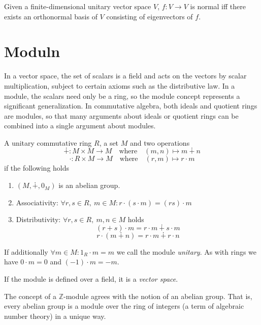 \begin{proposition}
   Given a finite-dimensional unitary vector space \(V\), \(f: V \to V\) is normal iff there exists an orthonormal basis of \(V\) consisting of eigenvectors of \(f\).
\end{proposition}

\section{Moduln}
In a vector space, the set of scalars is a field and acts on the vectors by scalar multiplication, subject to certain axioms such as the distributive law.
In a module, the scalars need only be a ring, so the module concept represents a significant generalization.
In commutative algebra, both ideals and quotient rings are modules, so that many arguments about ideals or quotient rings can be combined into a single argument about modules.

\begin{definition}[R-Module]
   A unitary commutative ring \(R\), a set \(M\) and two operations
   \[\dotplus: M \times M \to M \quad\text{where}\quad (m, n) \mapsto m \dotplus n\]
   \[\cdot: R \times M \to M \quad\text{where}\quad (r, m) \mapsto r \cdot m\]
   if the following holds
   \begin{enumerate}[label=\roman*, align=Center]
      \item \((M, \dotplus, 0_M)\) is an abelian group.
      \item Associativity: \(\forall r, s \in R,~m \in M: r \cdot (s \cdot m) = (rs) \cdot m\)
      \item Distributivity: \(\forall r, s \in R,~m,n \in M\) holds
         \[(r + s) \cdot m = r \cdot m \dotplus s \cdot m\]
         \[r \cdot (m \dotplus n) = r \cdot m \dotplus r \cdot n\]
   \end{enumerate}
\end{definition}
\begin{remark}
   If additionally \(\forall m \in M: 1_R \cdot m = m\) we call the module \emph{unitary}.
   As with rings we have \(0 \cdot m = 0\) and \((-1) \cdot m = -m\).
\end{remark}
\begin{remark}
   If the module is defined over a field, it is a \emph{vector space}.
\end{remark}
\begin{example}
   The concept of a \(\mathbb{Z}\)-module agrees with the notion of an abelian group.
   That is, every abelian group is a module over the ring of integers (a term of algebraic number theory) in a unique way.
\end{example}

